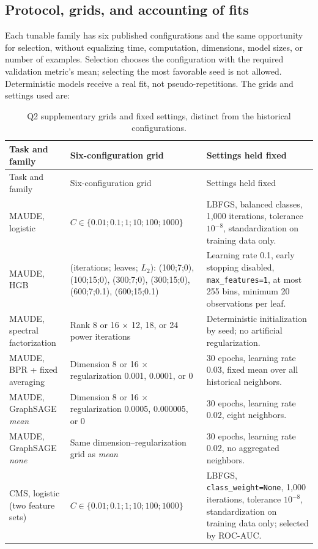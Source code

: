 \subsection{Protocol, grids, and accounting of fits}

Each tunable family has six published configurations and the same opportunity for selection, without equalizing time, computation, dimensions, model sizes, or number of examples. Selection chooses the configuration with the required validation metric's mean; selecting the most favorable seed is not allowed. Deterministic models receive a real fit, not pseudo-repetitions. The grids and settings used are:

\begin{longtable}{@{}p{26mm}p{68mm}p{48mm}@{}}
\caption{Q2 supplementary grids and fixed settings, distinct from the historical configurations.}\label{tab:q2-grids}\\
\toprule
Task and family & Six-configuration grid & Settings held fixed\\
\midrule\endfirsthead
\toprule
Task and family & Six-configuration grid & Settings held fixed\\
\midrule\endhead
MAUDE, logistic & $C\in\{0.01;0.1;1;10;100;1000\}$ & LBFGS, balanced classes, 1,000 iterations, tolerance $10^{-8}$, standardization on training data only.\\
MAUDE, HGB & (iterations; leaves; $L_2$): (100;7;0), (100;15;0), (300;7;0), (300;15;0), (600;7;0.1), (600;15;0.1) & Learning rate 0.1, early stopping disabled, \texttt{max\_features=1}, at most 255 bins, minimum 20 observations per leaf.\\
MAUDE, spectral factorization & Rank 8 or 16 $\times$ 12, 18, or 24 power iterations & Deterministic initialization by seed; no artificial regularization.\\
MAUDE, BPR + fixed averaging & Dimension 8 or 16 $\times$ regularization 0.001, 0.0001, or 0 & 30 epochs, learning rate 0.03, fixed mean over all historical neighbors.\\
MAUDE, GraphSAGE \emph{mean} & Dimension 8 or 16 $\times$ regularization 0.0005, 0.000005, or 0 & 30 epochs, learning rate 0.02, eight neighbors.\\
MAUDE, GraphSAGE \emph{none} & Same dimension--regularization grid as \emph{mean} & 30 epochs, learning rate 0.02, no aggregated neighbors.\\
CMS, logistic (two feature sets) & $C\in\{0.01;0.1;1;10;100;1000\}$ & LBFGS, \texttt{class\_weight=None}, 1,000 iterations, tolerance $10^{-8}$, standardization on training data only; selected by ROC-AUC.\\

\end{longtable}
